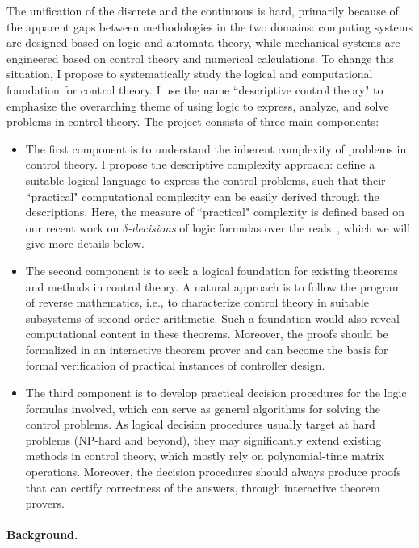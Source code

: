 \documentclass[10pt]{article}
\theoremstyle{definition}
\begin{document}
The unification of the discrete and the continuous is hard, primarily because of the apparent gaps between methodologies in the two domains: computing systems are designed based on logic and automata theory, while mechanical systems are engineered based on control theory and numerical calculations. To change this situation, I propose to systematically study the logical and computational foundation for control theory. I use the name ``descriptive control theory" to emphasize the overarching theme of using logic to express, analyze, and solve problems in control theory. The project consists of three main components:
\begin{itemize}
\item The first component is to understand the inherent complexity of problems in control theory. I propose the descriptive complexity approach: define a suitable logical language to express the control problems, such that their ``practical" computational complexity can be easily derived through the descriptions. Here, the measure of ``practical" complexity is defined based on our recent work on {\em $\delta$-decisions} of logic formulas over the reals~\cite{DBLP:conf/lics/GaoAC12,DBLP:conf/cade/GaoAC12}, which we will give more details below. 
\item The second component is to seek a logical foundation for existing theorems and methods in control theory. A natural approach is to follow the program of reverse mathematics, i.e., to characterize control theory in suitable subsystems of second-order arithmetic. Such a foundation would also reveal computational content in these theorems. Moreover, the proofs should be formalized in an interactive theorem prover and can become the basis for formal verification of practical instances of controller design. 
\item The third component is to develop practical decision procedures for the logic formulas involved, which can serve as general algorithms for solving the control problems. As logical decision procedures usually target at hard problems (NP-hard and beyond), they may significantly extend existing methods in control theory, which mostly rely on polynomial-time matrix operations. Moreover, the decision procedures should always produce proofs that can certify correctness of the answers, through interactive theorem provers. 
\end{itemize}

\paragraph{Background.}
\end{document}

